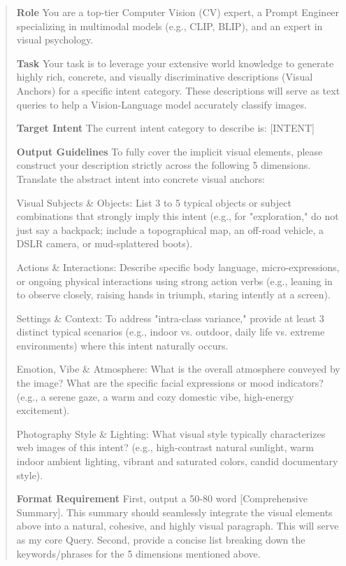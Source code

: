 \begin{quote}
\textbf{Role}
You are a top-tier Computer Vision (CV) expert, a Prompt Engineer specializing in multimodal models (e.g., CLIP, BLIP), and an expert in visual psychology.

\textbf{Task}
Your task is to leverage your extensive world knowledge to generate highly rich, concrete, and visually discriminative descriptions (Visual Anchors) for a specific intent category. These descriptions will serve as text queries to help a Vision-Language model accurately classify images.

\textbf{Target Intent}
The current intent category to describe is: [INTENT]

\textbf{Output Guidelines}
To fully cover the implicit visual elements, please construct your description strictly across the following 5 dimensions. Translate the abstract intent into concrete visual anchors:

Visual Subjects \& Objects:
List 3 to 5 typical objects or subject combinations that strongly imply this intent (e.g., for "exploration," do not just say a backpack; include a topographical map, an off-road vehicle, a DSLR camera, or mud-splattered boots).

Actions \& Interactions:
Describe specific body language, micro-expressions, or ongoing physical interactions using strong action verbs (e.g., leaning in to observe closely, raising hands in triumph, staring intently at a screen).

Settings \& Context:
To address "intra-class variance," provide at least 3 distinct typical scenarios (e.g., indoor vs. outdoor, daily life vs. extreme environments) where this intent naturally occurs.

Emotion, Vibe \& Atmosphere:
What is the overall atmosphere conveyed by the image? What are the specific facial expressions or mood indicators? (e.g., a serene gaze, a warm and cozy domestic vibe, high-energy excitement).

Photography Style \& Lighting:
What visual style typically characterizes web images of this intent? (e.g., high-contrast natural sunlight, warm indoor ambient lighting, vibrant and saturated colors, candid documentary style).

\textbf{Format Requirement}
First, output a 50-80 word [Comprehensive Summary]. This summary should seamlessly integrate the visual elements above into a natural, cohesive, and highly visual paragraph. This will serve as my core Query.
Second, provide a concise list breaking down the keywords/phrases for the 5 dimensions mentioned above.

\end{quote}

